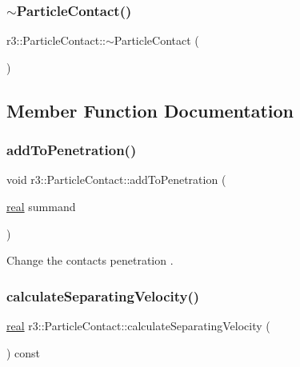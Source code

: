 \subsubsection{\texorpdfstring{$\sim$\+Particle\+Contact()}{~ParticleContact()}}
{\footnotesize\ttfamily r3\+::\+Particle\+Contact\+::$\sim$\+Particle\+Contact (\begin{DoxyParamCaption}{ }\end{DoxyParamCaption})\hspace{0.3cm}{\ttfamily [default]}}



\subsection{Member Function Documentation}
\mbox{\label{classr3_1_1_particle_contact_a0e798bd1d6c587ee1275ae0d70a4a728}} 
\subsubsection{\texorpdfstring{add\+To\+Penetration()}{addToPenetration()}}
{\footnotesize\ttfamily void r3\+::\+Particle\+Contact\+::add\+To\+Penetration (\begin{DoxyParamCaption}\item[{\mbox{\hyperlink{namespacer3_ab2016b3e3f743fb735afce242f0dc1eb}{real}}}]{summand }\end{DoxyParamCaption})}



Change the contact\textquotesingle{}s penetration . 

\mbox{\label{classr3_1_1_particle_contact_a50956285c7722f209ffa5f851502e6d9}} 
\subsubsection{\texorpdfstring{calculate\+Separating\+Velocity()}{calculateSeparatingVelocity()}}
{\footnotesize\ttfamily \mbox{\hyperlink{namespacer3_ab2016b3e3f743fb735afce242f0dc1eb}{real}} r3\+::\+Particle\+Contact\+::calculate\+Separating\+Velocity (\begin{DoxyParamCaption}{ }\end{DoxyParamCaption}) const}



